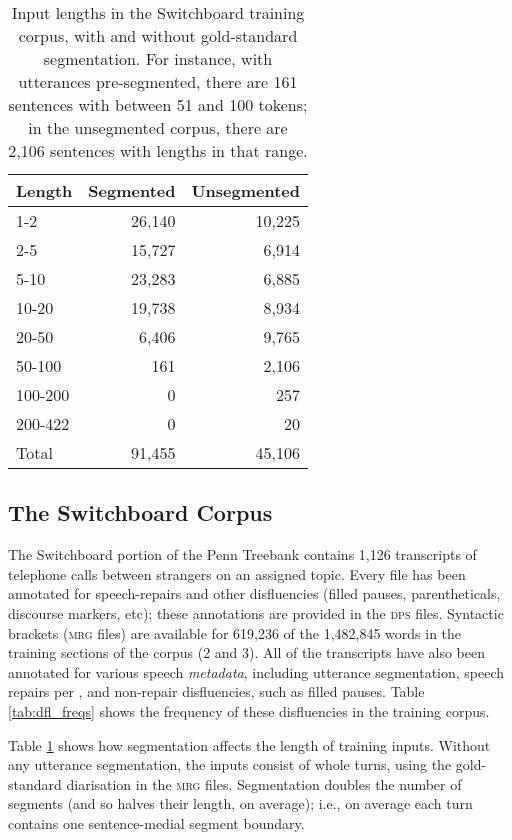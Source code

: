 \documentclass[11pt,letterpaper]{article}
\begin{document}
\begin{table}
\centering
\small
\begin{tabular}{l|rr}
    \hline
    Length & Segmented & Unsegmented \\
    \hline \hline
    1-2 & 26,140 & 10,225 \\
    2-5 & 15,727 & 6,914 \\
    5-10 & 23,283 & 6,885 \\
    10-20 & 19,738 &  8,934 \\
    20-50 & 6,406 & 9,765 \\
    50-100 & 161 & 2,106 \\
    100-200 & 0 & 257 \\
    200-422 & 0 & 20 \\
    \hline
    Total & 91,455 & 45,106 \\
    \hline
\end{tabular}
\caption{\small Input lengths in the Switchboard training corpus, with and without
    gold-standard segmentation.  For instance, with utterances pre-segmented,
    there are 161 sentences with between 51 and 100 tokens; in the unsegmented
corpus, there are 2,106 sentences with lengths in that range.
\label{tab:seg_freqs}}
\end{table}

\newpage
\subsection{The Switchboard Corpus}
\label{sec:swbd}

The Switchboard portion of the Penn Treebank \citep{marcus:93} contains 1,126
transcripts of telephone calls between strangers on an assigned topic.
Every file has been annotated for speech-repairs and other disfluencies (filled
pauses, parentheticals, discourse markers, etc); these annotations are provided
in the \textsc{dps} files.  Syntactic brackets (\textsc{mrg} files) are available
for 619,236 of the 1,482,845 words in the training sections of the corpus (2 and 3). 
All of the transcripts have also been annotated for various speech \emph{metadata},
including utterance segmentation, speech repairs per \citet{shriberg:94}, and 
non-repair disfluencies, such as filled pauses.  Table \ref{tab:dfl_freqs} shows the
frequency of these disfluencies in the training corpus.

Table \ref{tab:seg_freqs} shows how segmentation affects the length of training
inputs.  Without any utterance segmentation, the inputs consist of whole turns,
using the gold-standard diarisation in the \textsc{mrg} files.
Segmentation doubles the number of segments (and so halves their length, on average);
i.e., on average each turn contains one sentence-medial segment boundary.
\end{document}
